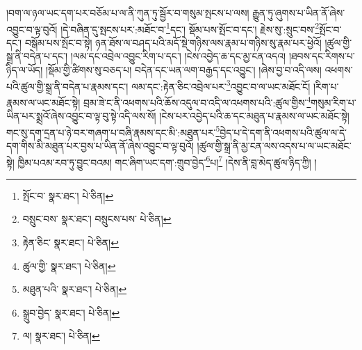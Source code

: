 །བག་ལ་ཉལ་ཡང་དག་པར་བཅོམ་པ་ལ་ནི་ཀུན་ཏུ་སྦྱོར་བ་གསུམ་སྤངས་པ་ལས། རྒྱུན་ཏུ་ཞུགས་པ་ཡིན་ནོ་ཞེས་འབྱུང་བ་ལྟ་བུའོ། །དེ་བཞིན་དུ་སྤངས་པར་:མཐོང་བ་\footnote{སྤོང་བ་  སྣར་ཐང་།  པེ་ཅིན། }དང་། སྡོམ་པས་སྤོང་བ་དང་། རྗེས་སུ་:སྲུང་བས་\footnote{བསྲུང་བས་  སྣར་ཐང་། བསྲུངས་པས་  པེ་ཅིན། }སྤོང་བ་དང་། བསྒོམ་པས་སྤོང་བ་སྟེ། ཉན་ཐོས་ལ་བཤད་པའི་མདོ་སྡེ་གཉིས་ལས་རྣམ་པ་གཉིས་སུ་རྣམ་པར་ཕྱེའོ། །ཚུལ་གྱི་སྒྲ་ནི་བདེན་པ་དང་། །ལམ་དང་འབྲེལ་འབྱུང་རིག་པ་དང་། །ངེས་འབྱེད་ཆ་དང་མྱ་ངན་འདའ། །ཐབས་དང་རིགས་པ་ཉིད་ལ་ཡོད། །སྡོམ་གྱི་ཚིགས་སུ་བཅད་པ། བདེན་དང་ཡན་ལག་བརྒྱད་དང་འབྱུང་། །ཞེས་བྱ་བ་འདི་ལས། འཕགས་པའི་ཚུལ་གྱི་སྒྲ་ནི་བདེན་པ་རྣམས་དང་། ལམ་དང་:རྟེན་ཅིང་འབྲེལ་པར་\footnote{རྟེན་ཅིང་  སྣར་ཐང་།  པེ་ཅིན། }འབྱུང་བ་ལ་ཡང་མཐོང་ངོ། །རིག་པ་རྣམས་ལ་ཡང་མཐོང་སྟེ། བྲམ་ཟེ་ང་ནི་འཕགས་པའི་ཆོས་འདུལ་བ་འདི་ལ་འཕགས་པའི་:ཚུལ་གྱིས་\footnote{ཚུལ་གྱི་  སྣར་ཐང་།  པེ་ཅིན། }གསུམ་རིག་པ་ཡིན་པར་སྨྲའོ་ཞེས་འབྱུང་བ་ལྟ་བུ་སྟེ་འདི་ལས་སོ། །ངེས་པར་འབྱེད་པའི་ཆ་དང་མཐུན་པ་རྣམས་ལ་ཡང་མཐོང་སྟེ། གང་སུ་དག་དྲན་པ་ཉེ་བར་གཞག་པ་བཞི་རྣམས་དང་མི་:མཐུན་པར་\footnote{མཐུན་པའི་  སྣར་ཐང་།  པེ་ཅིན། }བྱེད་པ་དེ་དག་ནི་འཕགས་པའི་ཚུལ་ལ་དེ་དག་གིས་མི་མཐུན་པར་བྱས་པ་ཡིན་ནོ་ཞེས་འབྱུང་བ་ལྟ་བུའོ། །ཚུལ་གྱི་སྒྲ་ནི་མྱ་ངན་ལས་འདས་པ་ལ་ཡང་མཐོང་སྟེ། ཁྱིམ་པའམ་རབ་ཏུ་བྱུང་བའམ། གང་ཞིག་ཡང་དག་:གྲུབ་བྱེད་\footnote{སྒྲུབ་བྱེད་  སྣར་ཐང་།  པེ་ཅིན། }པ།\footnote{ལ།  སྣར་ཐང་།  པེ་ཅིན། } །དེས་ནི་བླ་མེད་ཚུལ་ཉིད་ཀྱི། །
